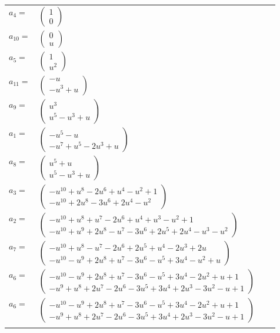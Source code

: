 \documentclass[1p]{elsarticle_modified}
\theoremstyle{definition}
\begin{document}
\begin{tabular}{m{7pt} m{180pt} m{7pt} m{180pt} }
\flushright $a_{4}=$&$\begin{pmatrix}1\\0\end{pmatrix}$ \\
\flushright $a_{10}=$&$\begin{pmatrix}0\\u\end{pmatrix}$ \\
\flushright $a_{5}=$&$\begin{pmatrix}1\\u^2\end{pmatrix}$ \\
\flushright $a_{11}=$&$\begin{pmatrix}- u\\- u^3+u\end{pmatrix}$ \\
\flushright $a_{9}=$&$\begin{pmatrix}u^3\\u^5- u^3+u\end{pmatrix}$ \\
\flushright $a_{1}=$&$\begin{pmatrix}- u^5- u\\- u^7+u^5-2 u^3+u\end{pmatrix}$ \\
\flushright $a_{8}=$&$\begin{pmatrix}u^5+u\\u^5- u^3+u\end{pmatrix}$ \\
\flushright $a_{3}=$&$\begin{pmatrix}- u^{10}+u^8-2 u^6+u^4- u^2+1\\- u^{10}+2 u^8-3 u^6+2 u^4- u^2\end{pmatrix}$ \\
\flushright $a_{2}=$&$\begin{pmatrix}- u^{10}+u^8+u^7-2 u^6+u^4+u^3- u^2+1\\- u^{10}+u^9+2 u^8- u^7-3 u^6+2 u^5+2 u^4- u^3- u^2\end{pmatrix}$ \\
\flushright $a_{7}=$&$\begin{pmatrix}- u^{10}+u^8- u^7-2 u^6+2 u^5+u^4-2 u^3+2 u\\- u^{10}- u^9+2 u^8+u^7-3 u^6- u^5+3 u^4- u^2+u\end{pmatrix}$ \\
\flushright $a_{6}=$&$\begin{pmatrix}- u^{10}- u^9+2 u^8+u^7-3 u^6- u^5+3 u^4-2 u^2+u+1\\- u^9+u^8+2 u^7-2 u^6-3 u^5+3 u^4+2 u^3-3 u^2- u+1\end{pmatrix}$\\ \flushright $a_{6}=$&$\begin{pmatrix}- u^{10}- u^9+2 u^8+u^7-3 u^6- u^5+3 u^4-2 u^2+u+1\\- u^9+u^8+2 u^7-2 u^6-3 u^5+3 u^4+2 u^3-3 u^2- u+1\end{pmatrix}$\\&\end{tabular}
\end{document}
